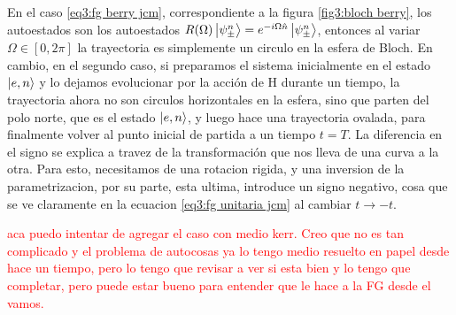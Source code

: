 En el caso \ref{eq3:fg berry jcm}, correspondiente a la figura \ref{fig3:bloch berry}, los autoestados son los autoestados $R(\Omega)\ket{\psi_\pm^n}=e^{-i\Omega \hat n}\ket{\psi_\pm^n}$, entonces al variar $\Omega\in [0,2\pi]$ la trayectoria es simplemente un circulo en la esfera de Bloch. En cambio, en el segundo caso, si preparamos el sistema inicialmente en el estado $\ket{e,n}$ y lo dejamos evolucionar por la acción de H durante un tiempo, la trayectoria ahora no son circulos horizontales en la esfera, sino que parten del polo norte, que es el estado $\ket{e,n}$, y luego hace una trayectoria ovalada, para finalmente volver al punto inicial de partida a un tiempo $t=T$. La diferencia en el signo se explica a travez de la transformación que nos lleva de una curva a la otra. Para esto, necesitamos de una rotacion rigida, y una inversion de la parametrizacion, por su parte, esta ultima, introduce un signo negativo, cosa que se ve claramente en la ecuacion \ref{eq3:fg unitaria jcm} al cambiar $t\rightarrow -t$.

\textcolor{red}{aca puedo intentar de agregar el caso con medio kerr. Creo que no es tan complicado y el problema de autocosas ya lo tengo medio resuelto en papel desde hace un tiempo, pero lo tengo que revisar a ver si esta bien y lo tengo que completar, pero puede estar bueno para entender que le hace a la FG desde el vamos.}

